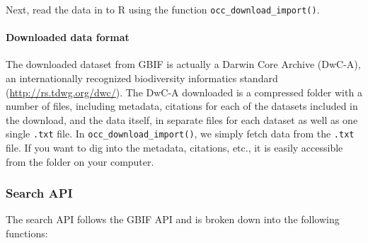 \documentclass[author-year, review, 11pt]{components/elsarticle} %
\newenvironment{Shaded}{\begin{snugshade}}{\end{snugshade}}
\newcommand{\KeywordTok}[1]{\textcolor[rgb]{0.13,0.29,0.53}{\textbf{{#1}}}}
\newcommand{\StringTok}[1]{\textcolor[rgb]{0.31,0.60,0.02}{{#1}}}
\newcommand{\CommentTok}[1]{\textcolor[rgb]{0.56,0.35,0.01}{\textit{{#1}}}}
\newcommand{\NormalTok}[1]{{#1}}
\begin{document}
Next, read the data in to R using the function
\texttt{occ\_download\_import()}.

\begin{Shaded}
\end{Shaded}

\paragraph{Downloaded data format}\label{downloaded-data-format}

The downloaded dataset from GBIF is actually a Darwin Core Archive
(DwC-A), an internationally recognized biodiversity informatics standard
(\url{http://rs.tdwg.org/dwc/}). The DwC-A downloaded is a compressed
folder with a number of files, including metadata, citations for each of
the datasets included in the download, and the data itself, in separate
files for each dataset as well as one single \texttt{.txt} file. In
\texttt{occ\_download\_import()}, we simply fetch data from the
\texttt{.txt} file. If you want to dig into the metadata, citations,
etc., it is easily accessible from the folder on your computer.

\subsubsection{Search API}\label{search-api}

The search API follows the GBIF API and is broken down into the
following functions:
\end{document}
